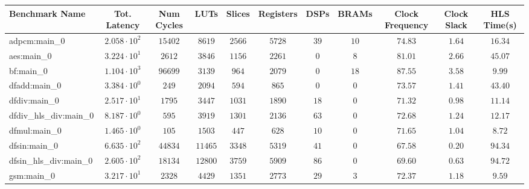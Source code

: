 \begin{tabular}{|l|c|c|c|c|c|c|c|c|c|c|}
\hline
Benchmark Name          & Tot. Latency           & Num Cycles & LUTs      & Slices    & Registers & DSPs    & BRAMs   & Clock Frequency & Clock Slack & HLS Time(s) \\
\hline
adpcm:main\_0           & $ 2.058 \cdot 10^{2} $ & $ 15402  $ & $ 8619  $ & $ 2566  $ & $ 5728  $ & $ 39  $ & $ 10  $ & $ 74.83       $ & $ 1.64    $ & $ 16.34   $ \\
aes:main\_0             & $ 3.224 \cdot 10^{1} $ & $ 2612   $ & $ 3846  $ & $ 1156  $ & $ 2261  $ & $ 0   $ & $ 8   $ & $ 81.01       $ & $ 2.66    $ & $ 45.07   $ \\
bf:main\_0              & $ 1.104 \cdot 10^{3} $ & $ 96699  $ & $ 3139  $ & $ 964   $ & $ 2079  $ & $ 0   $ & $ 18  $ & $ 87.55       $ & $ 3.58    $ & $ 9.99    $ \\
dfadd:main\_0           & $ 3.384 \cdot 10^{0} $ & $ 249    $ & $ 2094  $ & $ 594   $ & $ 865   $ & $ 0   $ & $ 0   $ & $ 73.57       $ & $ 1.41    $ & $ 43.40   $ \\
dfdiv:main\_0           & $ 2.517 \cdot 10^{1} $ & $ 1795   $ & $ 3447  $ & $ 1031  $ & $ 1890  $ & $ 18  $ & $ 0   $ & $ 71.32       $ & $ 0.98    $ & $ 11.14   $ \\
dfdiv\_hls\_div:main\_0 & $ 8.187 \cdot 10^{0} $ & $ 595    $ & $ 3919  $ & $ 1301  $ & $ 2136  $ & $ 63  $ & $ 0   $ & $ 72.68       $ & $ 1.24    $ & $ 12.17   $ \\
dfmul:main\_0           & $ 1.465 \cdot 10^{0} $ & $ 105    $ & $ 1503  $ & $ 447   $ & $ 628   $ & $ 10  $ & $ 0   $ & $ 71.65       $ & $ 1.04    $ & $ 8.72    $ \\
dfsin:main\_0           & $ 6.635 \cdot 10^{2} $ & $ 44834  $ & $ 11465 $ & $ 3348  $ & $ 5319  $ & $ 41  $ & $ 0   $ & $ 67.58       $ & $ 0.20    $ & $ 94.34   $ \\
dfsin\_hls\_div:main\_0 & $ 2.605 \cdot 10^{2} $ & $ 18134  $ & $ 12800 $ & $ 3759  $ & $ 5909  $ & $ 86  $ & $ 0   $ & $ 69.60       $ & $ 0.63    $ & $ 94.72   $ \\
gsm:main\_0             & $ 3.217 \cdot 10^{1} $ & $ 2328   $ & $ 4429  $ & $ 1351  $ & $ 2773  $ & $ 29  $ & $ 3   $ & $ 72.37       $ & $ 1.18    $ & $ 9.59    $ \\

\end{tabular}
